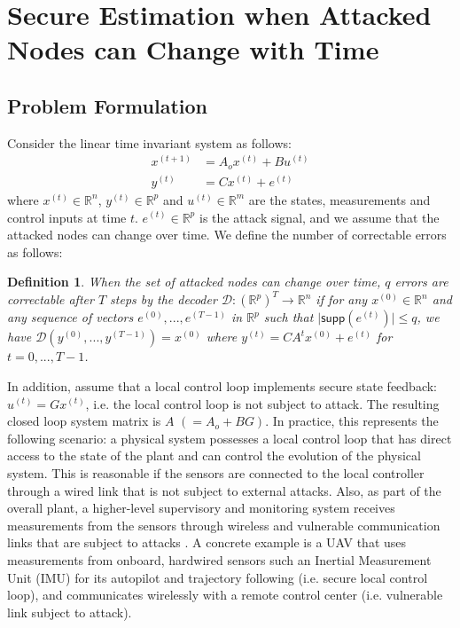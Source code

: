 \documentclass[journal]{IEEEtran}
\newtheorem{Def}{\bf{Definition}}
\begin{document}
\section{Secure Estimation when Attacked Nodes can Change with Time}  \label{sec:main}


\subsection{Problem Formulation}
Consider the linear time invariant system as follows:
\begin{equation}
\begin{aligned}
x^{(t+1)} &= A_o x^{(t)} + B u^{(t)} \\
y^{(t)} &= C x ^{(t)} + e^{(t) }
\end{aligned} 
\label{eq:system_model_se}
\end{equation} 
where $x^{(t)} \in \mathbb{R}^n$, $y^{(t)}  \in \mathbb{R}^p$ and $u^{(t)} \in \mathbb{R}^m$ are the states, measurements and control inputs at time $t$. $e^{(t)} \in \mathbb{R}^p$ is the attack signal, and we assume that the attacked nodes can change over time. We define the number of correctable errors as follows:

\begin{Def}\label{def:num_err_change}
When the set of attacked nodes can change over time, $q$ errors are correctable after $T$ steps by the decoder $\mathcal{D}: {(\mathbb{R} ^p) } ^T  \rightarrow \mathbb{R}^n$ if for any $x^{(0)} \in \mathbb{R}^n$ and any sequence of vectors $e^{(0)},...,e^{(T-1)}$ in $\mathbb{R}^p$ such that $\lvert \textsf{supp}(e^{(t)}) \rvert \leq q$, 
we have $\mathcal{D} (y^{(0)},...,y^{(T-1)}) = x^{(0)}$ where $y^{(t)} = CA^t x^{(0)} + e^{(t)}$ for $t=0,...,T-1$.
\end{Def}

In addition, assume that a local control loop implements secure state feedback: $u^{(t)} = Gx^{(t)}$, i.e. the local control loop is not subject to attack. The resulting closed loop system matrix is $A$ $(=A_o+BG)$. 
In practice, this represents the following scenario: a physical system possesses a local control loop that has direct access to the state of the plant and can control the evolution of the physical system. This is reasonable if the sensors are connected to the local controller through a wired link that is not subject to external attacks. Also, as part of the overall plant, a higher-level supervisory and monitoring system receives measurements from the sensors through wireless and vulnerable communication links that are subject to attacks \cite{Fawzi2014}. 
A concrete example is a UAV that uses measurements from onboard, hardwired sensors such an Inertial Measurement Unit (IMU) for its autopilot and trajectory following (i.e. secure local control loop), and communicates wirelessly with a remote control center (i.e. vulnerable link subject to attack).
\end{document}
